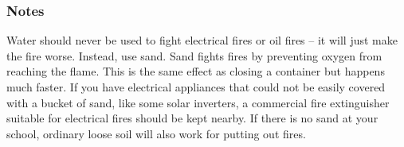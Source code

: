 \subsubsection*{Notes}
Water should never be used to fight electrical fires or oil fires -- it will just make the fire worse. Instead, use sand. Sand fights fires by preventing oxygen from reaching the flame. This is the same effect as closing a container but happens much faster. If you have electrical appliances that could not be easily covered with a bucket of sand, like some solar inverters, a commercial fire extinguisher suitable for electrical fires should be kept nearby. If there is no sand at your school, ordinary loose soil will also work for putting out fires.